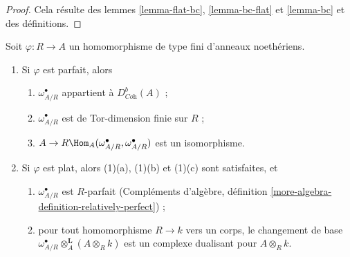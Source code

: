 \begin{proof}
Cela résulte des lemmes \ref{lemma-flat-bc}, \ref{lemma-bc-flat} et \ref{lemma-bc} et des définitions.
\end{proof}

\begin{lemma}
\label{lemma-relative-dualizing-algebraic}
Soit $\varphi : R \to A$ un homomorphisme de type fini d'anneaux noethériens.
\begin{enumerate}
\item Si $\varphi$ est parfait, alors
\begin{enumerate}
\item $\omega_{A/R}^\bullet$ appartient à $D^b_{\textit{Coh}}(A)$ ;
\item $\omega_{A/R}^\bullet$ est de Tor-dimension finie sur $R$ ;
\item $A \to R\Hom_A(\omega_{A/R}^\bullet, \omega_{A/R}^\bullet)$ est un isomorphisme.
\end{enumerate}
\item Si $\varphi$ est plat, alors (1)(a), (1)(b) et (1)(c) sont satisfaites, et
\begin{enumerate}
\item $\omega_{A/R}^\bullet$ est $R$-parfait
(Compléments d'algèbre, définition \ref{more-algebra-definition-relatively-perfect}) ;
\item pour tout homomorphisme $R \to k$ vers un corps, le changement de base
$\omega_{A/R}^\bullet \otimes_A^\mathbf{L} (A \otimes_R k)$
est un complexe dualisant pour $A \otimes_R k$.
\end{enumerate}
\end{enumerate}
\end{lemma}

